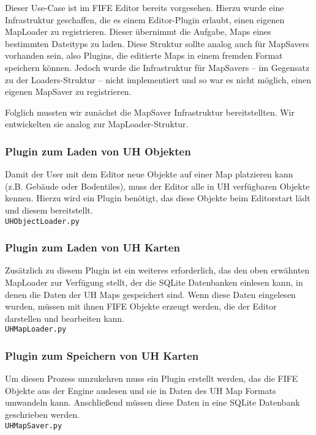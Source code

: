 Dieser Use-Case ist im FIFE Editor bereits vorgesehen. Hierzu wurde eine Infrastruktur geschaffen, die
es einem Editor-Plugin erlaubt, einen eigenen MapLoader zu registrieren. Dieser übernimmt die
Aufgabe, Maps eines bestimmten Dateityps zu laden. Diese Struktur sollte analog
auch für MapSavers vorhanden sein, also Plugins, die editierte Maps in einem
fremden Format speichern können. Jedoch wurde die Infrastruktur für
MapSavers -- im Gegensatz zu der Loaders-Struktur -- nicht
implementiert und so war es nicht möglich, einen eigenen MapSaver zu
registrieren.

Folglich mussten wir zunächst die MapSaver Infrastruktur bereitstellten. Wir
entwickelten sie analog zur MapLoader-Struktur.

\subsubsection{Plugin zum Laden von UH Objekten}
Damit der User mit dem Editor neue Objekte auf einer Map platzieren kann (z.B.
Gebäude oder Bodentiles), muss der Editor alle in UH verfügbaren Objekte kennen.
Hierzu wird ein Plugin benötigt, das diese Objekte beim Editorstart lädt und
diesem bereitstellt. \\
{\tt UHObjectLoader.py}

\subsubsection{Plugin zum Laden von UH Karten}
Zusätzlich zu diesem Plugin ist ein weiteres erforderlich, das den oben erwähnten MapLoader
zur Verfügung stellt, der die SQLite Datenbanken einlesen kann, in denen die Daten der
UH Maps gespeichert sind. Wenn diese Daten eingelesen wurden, müssen mit ihnen FIFE Objekte
erzeugt werden, die der Editor darstellen und bearbeiten kann. \\
{\tt UHMapLoader.py}


\subsubsection{Plugin zum Speichern von UH Karten}
Um diesen Prozess umzukehren muss ein Plugin erstellt werden, das die FIFE Objekte aus der
Engine auslesen und sie in Daten des UH Map Formats umwandeln kann. Anschließend müssen diese
Daten in eine SQLite Datenbank geschrieben werden. \\
{\tt UHMapSaver.py}

